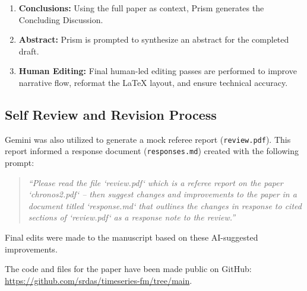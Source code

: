 \documentclass[twocolumn]{article}
\begin{document}
\begin{enumerate}[label=\arabic*.]
    \item \textbf{Conclusions:} Using the full paper as context, Prism generates the Concluding Discussion.
    \item \textbf{Abstract:} Prism is prompted to synthesize an abstract for the completed draft.
    \item \textbf{Human Editing:} Final human-led editing passes are performed to improve narrative flow, reformat the \LaTeX{} layout, and ensure technical accuracy.
\end{enumerate}

\subsection*{Self Review and Revision Process}
Gemini was also utilized to generate a mock referee report (\texttt{review.pdf}). This report informed a response document (\texttt{responses.md}) created with the following prompt: 
\begin{quote}
    \textit{``Please read the file ‘review.pdf‘ which is a referee report on the paper ‘chronos2.pdf‘ – then suggest changes and improvements to the paper in a document titled ‘response.md‘ that outlines the changes in response to cited sections of ‘review.pdf‘ as a response note to the review.''}
\end{quote}
Final edits were made to the manuscript based on these AI-suggested improvements. 

The code and files for the paper have been made public on GitHub: \url{https://github.com/srdas/timeseries-fm/tree/main}.
\end{document}

